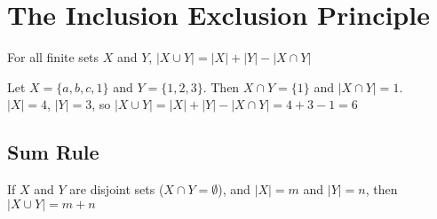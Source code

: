 \documentclass[../notes.tex]{subfiles}
\begin{document}
		\section{The Inclusion Exclusion Principle}
			For all finite sets $X$ and $Y$, $\left\lvert X \cup Y\right\rvert = \left\lvert X\right\rvert + \left\lvert Y \right\rvert - \left\lvert X \cap Y\right\rvert $
			\begin{example}
				Let $X = \{a, b, c, 1\}$ and $Y = \{1, 2, 3\}$. Then $X \cap Y = \{1\}$ and $\left\lvert X \cap Y\right\rvert = 1$.\\
				$\left\lvert X\right\rvert = 4$, $\left\lvert Y\right\rvert = 3$, so $\left\lvert X \cup Y\right\rvert = \left\lvert X\right\rvert + \left\lvert Y\right\rvert - \left\lvert X \cap Y\right\rvert = 4 + 3 - 1 = 6$
			\end{example}
			\subsection{Sum Rule}
				If $X$ and $Y$ are disjoint sets ($X \cap Y = \emptyset$), and $\left\lvert X\right\rvert = m$ and $\left\lvert Y\right\rvert = n $, then $\left\lvert X \cup Y\right\rvert = m + n $
\end{document}
